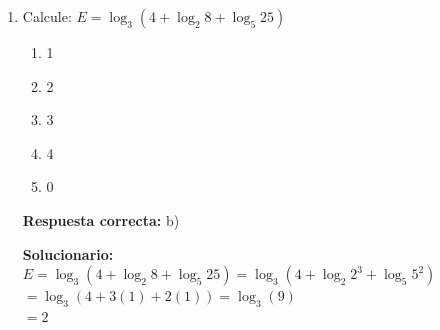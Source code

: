 \begin{enumerate}
	\vspace{2mm}
	\textbf{Solucionario:}\\
	$(A + I)^2 - (A - I)^2 = \begin{pmatrix} 4 & -3 \\ 3 & 2 \end{pmatrix} - \begin{pmatrix} -1 & 0 \\ 0 & -1 \end{pmatrix} = \begin{pmatrix} 5 & -3 \\ 3 & 3 \end{pmatrix}$\\
	$[A + I + A - I][A + I - A + I] = \begin{pmatrix} 5 & -3 \\ 3 & 3 \end{pmatrix}$\\
	$2A \cdot 2I = \begin{pmatrix} 5 & -3 \\ 3 & 3 \end{pmatrix} \Rightarrow A = \begin{pmatrix} \frac{5}{4} & \frac{-3}{4} \\ \frac{3}{4} & \frac{3}{4} \end{pmatrix}$\\
	Traza de $A = \frac{5}{4} + \frac{3}{4} = 2$
	
	\vspace{6mm}
	
	\item Calcule:
	$E = \log_3(4 + \log_2 8 + \log_5 25)$
	\begin{enumerate}[label=\alph*)]
		\item 1
		\item 2
		\item 3
		\item 4
		\item 0
	\end{enumerate}
	\textbf{Respuesta correcta:} b)
	
	\vspace{2mm}
	\textbf{Solucionario:}\\
	$E = \log_3(4 + \log_2 8 + \log_5 25) = \log_3(4 + \log_2 2^3 + \log_5 5^2)$\\
	$= \log_3(4 + 3(1) + 2(1)) = \log_3(9)$\\
	$= 2$
	
	\vspace{6mm}
\end{enumerate}



